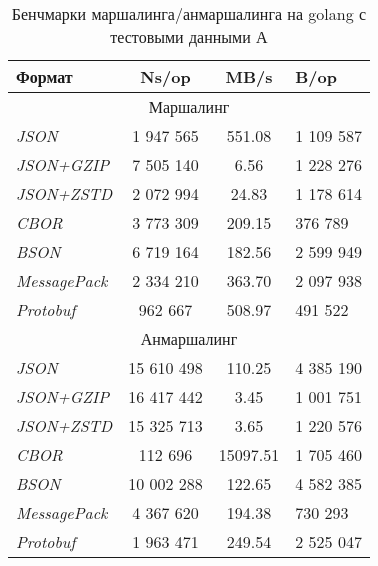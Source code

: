 \begin{longtable}[ht!]{|l|c|c|l|} 
\caption{Бенчмарки маршалинга/анмаршалинга на golang с тестовыми данными А}
\hline
\textbf{Формат}      & \textbf{Ns/op} & \textbf{MB/s} & \textbf{B/op}  \\ 
\hline
\multicolumn{4}{|c|}{Маршалинг}                                        \\ 
\hline
\textit{JSON}        & 1 947 565        & 551.08        & 1 109 587        \\ 
\hline
\textit{JSON+GZIP}   & 7 505 140        & 6.56          & 1 228 276        \\ 
\hline
\textit{JSON+ZSTD}   & 2 072 994        & 24.83         & 1 178 614        \\ 
\hline
\textit{CBOR}        & 3 773 309        & 209.15        & 376 789         \\ 
\hline
\textit{BSON}        & 6 719 164        & 182.56        & 2 599 949        \\ 
\hline
\textit{MessagePack} & 2 334 210        & 363.70        & 2 097 938        \\ 
\hline
\textit{Protobuf}    & 962 667         & 508.97        & 491 522         \\ 
\hline
\multicolumn{4}{|c|}{Анмаршалинг}                                      \\ 
\hline
\textit{JSON}        & 15 610 498       & 110.25        & 4 385 190        \\ 
\hline
\textit{JSON+GZIP}   & 16 417 442       & 3.45          & 1 001 751        \\ 
\hline
\textit{JSON+ZSTD}   & 15 325 713       & 3.65          & 1 220 576        \\ 
\hline
\textit{CBOR}        & 112 696         & 15097.51      & 1 705 460        \\ 
\hline
\textit{BSON}        & 10 002 288       & 122.65        & 4 582 385        \\ 
\hline
\textit{MessagePack} & 4 367 620        & 194.38        & 730 293         \\ 
\hline
\textit{Protobuf}    & 1 963 471        & 249.54        & 2 525 047        \\
\hline
\end{longtable}


